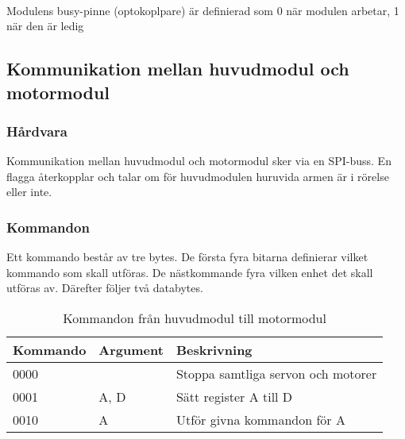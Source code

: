  \\

Modulens busy-pinne (optokoplpare) är definierad som 0 när modulen arbetar, 1 när den är ledig

\subsection{Kommunikation mellan huvudmodul och motormodul} \label{protokoll:pc-motor}

\subsubsection{Hårdvara}
Kommunikation mellan huvudmodul och motormodul sker via en SPI-buss. En flagga återkopplar och talar om för huvudmodulen huruvida armen är i rörelse eller inte.

\subsubsection{Kommandon}
Ett kommando består av tre bytes. De första fyra bitarna definierar vilket kommando som skall utföras. De nästkommande fyra vilken enhet det skall utföras av. Därefter följer två databytes. 

\begin{table}[h]
	\centering
		\begin{tabularx}{\textwidth}{| l | l | X |}
			\hline
			\textbf{Kommando} & \textbf{Argument} & \textbf{Beskrivning} \\
			\hline
			{0000} & {} & {Stoppa samtliga servon och motorer} \\
			\hline
			{0001} & {A, D} & {Sätt register A till D} \\
			\hline
			{0010} & {A} & {Utför givna kommandon för A} \\
			\hline
		\end{tabularx}
	\caption{Kommandon från huvudmodul till motormodul} \label{protokoll:pc-motor-tabell}
\end{table}

